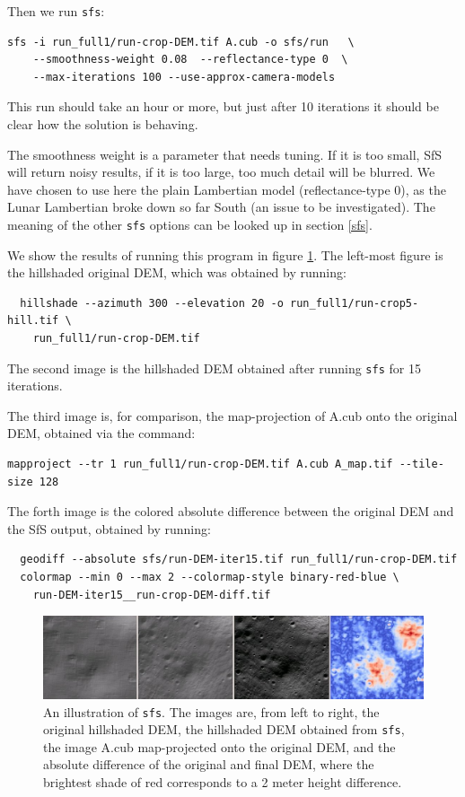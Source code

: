 Then we run \texttt{sfs}:
\begin{verbatim}
sfs -i run_full1/run-crop-DEM.tif A.cub -o sfs/run   \
    --smoothness-weight 0.08  --reflectance-type 0  \
    --max-iterations 100 --use-approx-camera-models
\end{verbatim}
This run should take an hour or more, but just after 10 iterations
it should be clear how the solution is behaving.

The smoothness weight is a parameter that needs tuning. If it is too
small, SfS will return noisy results, if it is too large, too much
detail will be blurred. We have chosen to use here the plain Lambertian
model (reflectance-type 0), as the Lunar Lambertian broke down so far
South (an issue to be investigated). The meaning of the other
\texttt{sfs} options can be looked up in section \ref{sfs}.

We show the results of running this program in figure
\ref{fig:sfs1}. The left-most figure is the hillshaded original DEM,
which was obtained by running:
\begin{verbatim}
  hillshade --azimuth 300 --elevation 20 -o run_full1/run-crop5-hill.tif \
    run_full1/run-crop-DEM.tif
\end{verbatim}
The second image is the hillshaded DEM obtained after running
\texttt{sfs} for 15 iterations.

The third image is, for comparison, the map-projection of A.cub onto the
original DEM, obtained via the command:
\begin{verbatim}
mapproject --tr 1 run_full1/run-crop-DEM.tif A.cub A_map.tif --tile-size 128
\end{verbatim}
The forth image is the colored absolute difference between the original
DEM and the SfS output, obtained by running:
\begin{verbatim}
  geodiff --absolute sfs/run-DEM-iter15.tif run_full1/run-crop-DEM.tif
  colormap --min 0 --max 2 --colormap-style binary-red-blue \
    run-DEM-iter15__run-crop-DEM-diff.tif
\end{verbatim}
\begin{figure}[h!]
\begin{center}
\includegraphics[width=7in]{images/sfs1.jpg}
\caption[sfs]{An illustration of \texttt{sfs}. The images are, from
  left to right, the original hillshaded DEM, the hillshaded DEM obtained
from \texttt{sfs}, the image A.cub map-projected onto the original DEM,
and the absolute difference of the original and final DEM, where the brightest
shade of red corresponds to a 2 meter height difference.}
\label{fig:sfs1}
\end{center}
\end{figure}

